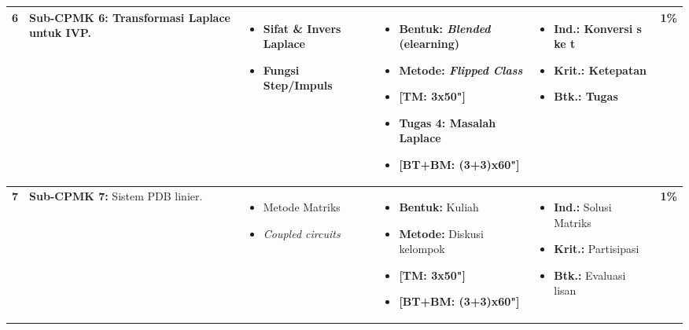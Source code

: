 \documentclass[11pt,a4paper]{article}
\begin{document}
\begin{longtable}{|C{0.6cm}|L{4.2cm}|L{4.5cm}|L{4.5cm}|L{3.5cm}|C{1.1cm}|}
\textbf{6} & \textbf{Sub-CPMK 6:} Transformasi Laplace untuk IVP. & \vspace{-4mm} \begin{itemize}[leftmargin=*, noitemsep] \item Sifat \& Invers Laplace \item Fungsi Step/Impuls \end{itemize} \vspace{-4mm} & \vspace{-4mm} \begin{itemize}[leftmargin=*, noitemsep] \item \textbf{Bentuk:} \textit{Blended} (elearning) \item \textbf{Metode:} \textit{Flipped Class} \item \textbf{[TM: 3x50"]} \item Tugas 4: Masalah Laplace \item \textbf{[BT+BM: (3+3)x60"]} \end{itemize} \vspace{-4mm} & \vspace{-4mm} \begin{itemize}[leftmargin=*, noitemsep] \item \textbf{Ind.:} Konversi s ke t \item \textbf{Krit.:} Ketepatan \item \textbf{Btk.:} Tugas \end{itemize} \vspace{-4mm} & \textbf{1\%} \\ \hline

\textbf{7} & \textbf{Sub-CPMK 7:} Sistem PDB linier. & \vspace{-4mm} \begin{itemize}[leftmargin=*, noitemsep] \item Metode Matriks \item \textit{Coupled circuits} \end{itemize} \vspace{-4mm} & \vspace{-4mm} \begin{itemize}[leftmargin=*, noitemsep] \item \textbf{Bentuk:} Kuliah \item \textbf{Metode:} Diskusi kelompok \item \textbf{[TM: 3x50"]} \item \textbf{[BT+BM: (3+3)x60"]} \end{itemize} \vspace{-4mm} & \vspace{-4mm} \begin{itemize}[leftmargin=*, noitemsep] \item \textbf{Ind.:} Solusi Matriks \item \textbf{Krit.:} Partisipasi \item \textbf{Btk.:} Evaluasi lisan \end{itemize} \vspace{-4mm} & \textbf{1\%} \\ \hline


\end{longtable}
\end{document}
